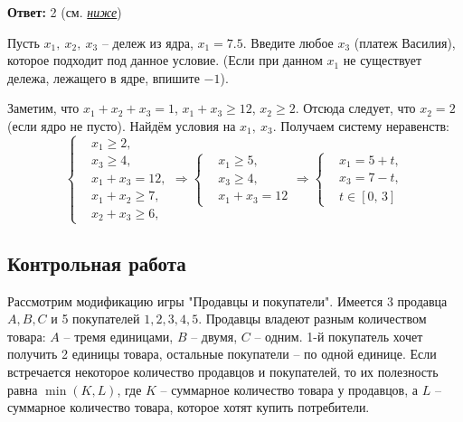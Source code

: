 	\textbf{Ответ:} 2 (см. \hyperref[sec6:sol]{\textit{ниже}})
	
	\task
	\label{sec6}
	Пусть $x_1,~x_2,~x_3$ -- дележ из ядра, $x_1 = 7.5$. Введите любое $x_3$ (платеж Василия), которое подходит под данное условие. (Если при данном $x_1$ не существует дележа, лежащего в ядре, впишите $-1$).
	
	\solution
	\label{sec6:sol}
	Заметим, что $x_1+x_2+x_3=1$, $x_1+x_3 \geq 12$, $x_2 \geq 2$. Отсюда следует, что $x_2=2$ (если ядро не пусто). Найдём условия на $x_1,~x_3$. Получаем систему неравенств:
	\[
	\left\{
		\begin{aligned}
			& x_1 \geq 2, \\
			& x_3 \geq 4, \\
			& x_1 + x_3 = 12, \\
			& x_1 + x_2 \geq 7, \\
			& x_2 + x_3 \geq 6,
		\end{aligned}
	\right.
	\Rightarrow
	\left\{
		\begin{aligned}
			& x_1 \geq 5, \\
			& x_3 \geq 4, \\
			& x_1 + x_3 = 12
		\end{aligned}
	\right.
	\Rightarrow
	\left\{
		\begin{aligned}
			& x_1 = 5 + t, \\
			& x_3 = 7 - t, \\
			& t \in [0,\, 3]
		\end{aligned}
	\right.
	\]
	
	
	
	
	
	
	
	
	
	
	
	
	
	
\subsection{Контрольная работа}
	\task
	Рассмотрим модификацию игры "Продавцы и покупатели". Имеется 3 продавца $A,B,C$ и 5 покупателей $1,2,3,4,5$. Продавцы владеют разным количеством товара: $A$ -- тремя единицами, $B$ -- двумя, $C$ -- одним. 1-й покупатель хочет получить 2 единицы товара, остальные покупатели -- по одной единице. Если встречается некоторое количество продавцов и покупателей, то их полезность равна $\min(K,L)$, где $K$ -- суммарное количество товара у продавцов, а $L$ -- суммарное количество товара, которое хотят купить потребители.
	
